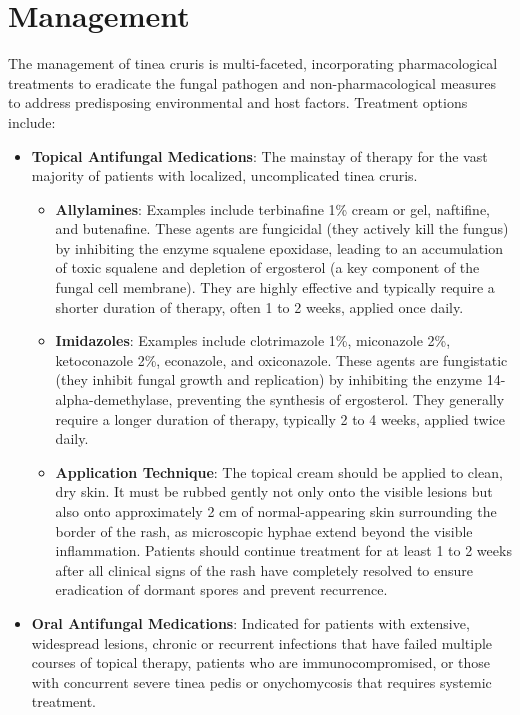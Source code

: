 \section*{Management}
The management of tinea cruris is multi-faceted, incorporating pharmacological treatments to eradicate the fungal pathogen and non-pharmacological measures to address predisposing environmental and host factors.
Treatment options include:
\begin{itemize}
    \item \textbf{Topical Antifungal Medications}: The mainstay of therapy for the vast majority of patients with localized, uncomplicated tinea cruris.
    \begin{itemize}
        \item \textbf{Allylamines}: Examples include terbinafine 1\% cream or gel, naftifine, and butenafine. These agents are fungicidal (they actively kill the fungus) by inhibiting the enzyme squalene epoxidase, leading to an accumulation of toxic squalene and depletion of ergosterol (a key component of the fungal cell membrane). They are highly effective and typically require a shorter duration of therapy, often 1 to 2 weeks, applied once daily.
        \item \textbf{Imidazoles}: Examples include clotrimazole 1\%, miconazole 2\%, ketoconazole 2\%, econazole, and oxiconazole. These agents are fungistatic (they inhibit fungal growth and replication) by inhibiting the enzyme 14-alpha-demethylase, preventing the synthesis of ergosterol. They generally require a longer duration of therapy, typically 2 to 4 weeks, applied twice daily.
        \item \textbf{Application Technique}: The topical cream should be applied to clean, dry skin. It must be rubbed gently not only onto the visible lesions but also onto approximately 2 cm of normal-appearing skin surrounding the border of the rash, as microscopic hyphae extend beyond the visible inflammation. Patients should continue treatment for at least 1 to 2 weeks after all clinical signs of the rash have completely resolved to ensure eradication of dormant spores and prevent recurrence.
    \end{itemize}
    \item \textbf{Oral Antifungal Medications}: Indicated for patients with extensive, widespread lesions, chronic or recurrent infections that have failed multiple courses of topical therapy, patients who are immunocompromised, or those with concurrent severe tinea pedis or onychomycosis that requires systemic treatment.

\end{itemize}
